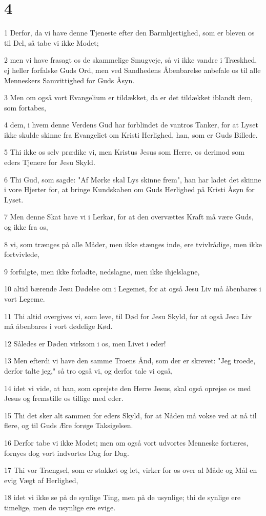 \chapter{4}

\par 1 Derfor, da vi have denne Tjeneste efter den Barmhjertighed, som er bleven os til Del, så tabe vi ikke Modet;
\par 2 men vi have frasagt os de skammelige Smugveje, så vi ikke vandre i Træskhed, ej heller forfalske Guds Ord, men ved Sandhedens Åbenbarelse anbefale os til alle Menneskers Samvittighed for Guds Åsyn.
\par 3 Men om også vort Evangelium er tildækket, da er det tildækket iblandt dem, som fortabes,
\par 4 dem, i hvem denne Verdens Gud har forblindet de vantros Tanker, for at Lyset ikke skulde skinne fra Evangeliet om Kristi Herlighed, han, som er Guds Billede.
\par 5 Thi ikke os selv prædike vi, men Kristus Jesus som Herre, os derimod som eders Tjenere for Jesu Skyld.
\par 6 Thi Gud, som sagde: "Af Mørke skal Lys skinne frem", han har ladet det skinne i vore Hjerter for, at bringe Kundskaben om Guds Herlighed på Kristi Åsyn for Lyset.
\par 7 Men denne Skat have vi i Lerkar, for at den overvættes Kraft må være Guds, og ikke fra os,
\par 8 vi, som trænges på alle Måder, men ikke stænges inde, ere tvivlrådige, men ikke fortvivlede,
\par 9 forfulgte, men ikke forladte, nedslagne, men ikke ihjelslagne,
\par 10 altid bærende Jesu Dødelse om i Legemet, for at også Jesu Liv må åbenbares i vort Legeme.
\par 11 Thi altid overgives vi, som leve, til Død for Jesu Skyld, for at også Jesu Liv må åbenbares i vort dødelige Kød.
\par 12 Således er Døden virksom i os, men Livet i eder!
\par 13 Men efterdi vi have den samme Troens Ånd, som der er skrevet: "Jeg troede, derfor talte jeg," så tro også vi, og derfor tale vi også,
\par 14 idet vi vide, at han, som oprejste den Herre Jesus, skal også oprejse os med Jesus og fremstille os tillige med eder.
\par 15 Thi det sker alt sammen for eders Skyld, for at Nåden må vokse ved at nå til flere, og til Guds Ære forøge Taksigelsen.
\par 16 Derfor tabe vi ikke Modet; men om også vort udvortes Menneske fortæres, fornyes dog vort indvortes Dag for Dag.
\par 17 Thi vor Trængsel, som er stakket og let, virker for os over al Måde og Mål en evig Vægt af Herlighed,
\par 18 idet vi ikke se på de synlige Ting, men på de usynlige; thi de synlige ere timelige, men de usynlige ere evige.

